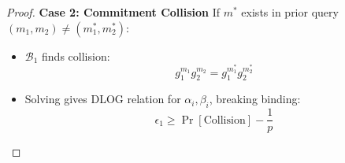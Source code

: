 \begin{proof}
\noindent \textbf{Case 2: Commitment Collision}
If $m^*$ exists in prior query $(m_1, m_2) \neq (m_1^*, m_2^*)$:
\begin{itemize}
    \item $\mathcal{B}_1$ finds collision:
    \[
    g_1^{m_1}g_2^{m_2} = g_1^{m_1^*}g_2^{m_2^*}
    \]
    \item Solving gives DLOG relation for $\alpha_i, \beta_i$, breaking binding:
    \[
    \epsilon_1 \geq \Pr[\text{Collision}] - \frac{1}{p}
    \]
\end{itemize}


\end{proof}








% 
% 



































% 
% 




